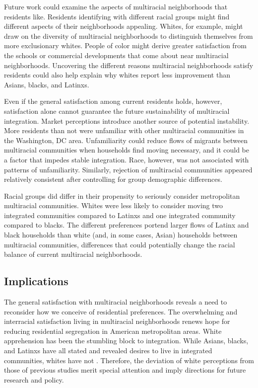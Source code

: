 \documentclass{baderart}
\begin{document}
Future work could examine the aspects of multiracial neighborhoods that residents like. Residents identifying with different racial groups might find different aspects of their neighborhoods appealing. Whites, for example, might draw on the diversity of multiracial neighborhoods to distinguish themselves from more exclusionary whites. People of color might derive greater satisfaction from the schools or commercial developments that come about near multiracial neighborhoods. Uncovering the different reasons multiracial neighborhoods satisfy residents could also help explain why whites report less improvement than Asians, blacks, and Latinxs. 

Even if the general satisfaction among current residents holds, however, satisfaction alone cannot guarantee the future sustainability of multiracial integration. Market perceptions introduce another source of potential instability. More residents than not were unfamiliar with other multiracial communities in the Washington, DC area. Unfamiliarity could reduce flows of migrants between multiracial communities when households find moving necessary, and it could be a factor that impedes stable integration. Race, however, was not associated with patterns of unfamiliarity. Similarly, rejection of multiracial communities appeared relatively consistent after controlling for group demographic differences. 

Racial groups did differ in their propensity to seriously consider metropolitan multiracial communities. Whites were less likely to consider moving two integrated communities compared to Latinxs and one integrated community compared to blacks. The different preferences portend larger flows of Latinx and black households than white (and, in some cases, Asian) households between multiracial communities, differences that could potentially change the racial balance of current multiracial neighborhoods. 

\subsection{Implications}
The general satisfaction with multiracial neighborhoods reveals a need to reconsider how we conceive of residential preferences. The overwhelming and interracial satisfaction living in multiracial neighborhoods renews hope for reducing residential segregation in American metropolitan areas. White apprehension has been the stumbling block to integration. While Asians, blacks, and Latinxs have all stated and revealed desires to live in integrated communities, whites have not \citep{charles_neighborhood_2000}. Therefore, the deviation of white perceptions from those of previous studies merit special attention and imply directions for future research and policy. 
\end{document}

